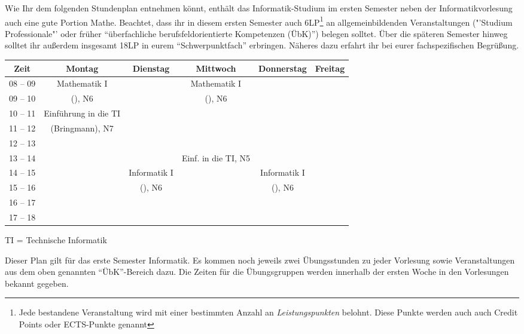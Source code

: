 Wie Ihr dem folgenden Stundenplan entnehmen könnt, enthält das Informatik-Studium im ersten
Semester neben der Informatikvorlesung auch eine gute Portion Mathe. Beachtet, dass ihr
in diesem ersten Semester auch 6LP\footnote{Jede bestandene Veranstaltung wird mit einer bestimmten Anzahl an \emph{Leistungspunkten} belohnt. Diese Punkte werden auch auch Credit Points oder ECTS-Punkte genannt} an allgemeinbildenden Veranstaltungen ("'Studium Professionale"' oder früher "`überfachliche berufsfeldorientierte Kompetenzen (ÜbK)"') belegen solltet.
Über die späteren Semester hinweg solltet ihr außerdem insgesamt 18LP in eurem "`Schwerpunktfach"' erbringen. Näheres dazu erfahrt ihr bei eurer fachspezifischen Begrüßung.

\begin{center}
	\begin{tabular}{|c|c|c|c|c|c|} \hline
		Zeit      & 			Montag 		& Dienstag			& Mittwoch 		    	& Donnerstag 			& Freitag   \\
		\hline\hline
		08 -- 09  & 		Mathematik I 	&  					& Mathematik I 		    &  						&			\\
		\cline{1-1}\cline{3-3}\cline{5-6}
		09 -- 10  & 		(\Matheprof), N6& 					& (\Matheprof), N6      &  						&			\\
		\hline
		10 -- 11  &	Einführung in die TI	&					&				    	&						&			\\
		\cline{1-1}\cline{3-6}
		11 -- 12 & 	(Bringmann), N7			&  					&					    &			 			& 			\\
		\hline
		12 -- 13 & 							& 				 	& 				        & 						& 			\\
		\hline
		13 -- 14 & 							& 					& Einf. in die TI, N5	& 						& 			\\
		\hline
		14 -- 15 & 							& Informatik I 		& 				    	& Informatik I 			& 			\\
		\cline{1-2}\cline{4-4}\cline{6-6}
		15 -- 16 &							 & (\Infoprof), N6 	& 					    & (\Infoprof), N6 		& 			\\
		\hline
		16 -- 17 & & & & &\\
		\hline
		17 -- 18 & & & & & \\
		\hline
	\end{tabular}
	
\scriptsize TI = Technische Informatik

\end{center}

Dieser Plan gilt für das erste Semester Informatik. Es kommen noch jeweils zwei Übungsstunden zu jeder Vorlesung 
sowie Veranstaltungen aus dem oben genannten "`\"UbK"'-Bereich dazu.
Die Zeiten für die Übungsgruppen werden innerhalb der ersten Woche in den Vorlesungen bekannt gegeben.
